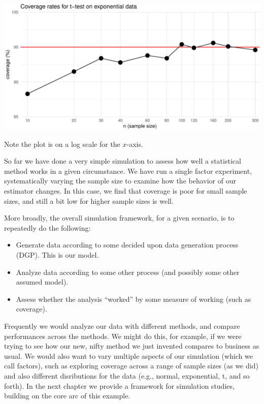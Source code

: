 \documentclass[
]{book}
\providecommand{\tightlist}{%
  \setlength{\itemsep}{0pt}\setlength{\parskip}{0pt}}
\begin{document}
\begin{center}\includegraphics[width=0.75\linewidth]{Designing-Simulations-in-R_files/figure-latex/ttest_result_figure-1} \end{center}

Note the plot is on a log scale for the \(x\)-axis.

So far we have done a very simple simulation to assess how well a statistical method works in a given circumstance.
We have run a single factor experiment, systematically varying the sample size to examine how the behavior of our estimator changes.
In this case, we find that coverage is poor for small sample sizes, and still a bit low for higher sample sizes is well.

More broadly, the overall simulation framework, for a given scenario, is to repeatedly do the following:

\begin{itemize}
\tightlist
\item
  Generate data according to some decided upon data generation process (DGP).
  This is our model.
\item
  Analyze data according to some other process (and possibly some other assumed model).
\item
  Assess whether the analysis ``worked'' by some measure of working (such as coverage).
\end{itemize}

Frequently we would analyze our data with different methods, and compare performances across the methods.
We might do this, for example, if we were trying to see how our new, nifty method we just invented compares to business as usual.
We would also want to vary multiple aspects of our simulation (which we call factors), such as exploring coverage across a range of sample sizes (as we did) and also different disributions for the data (e.g., normal, exponential, t, and so forth).
In the next chapter we provide a framework for simulation studies, building on the core arc of this example.
\end{document}
